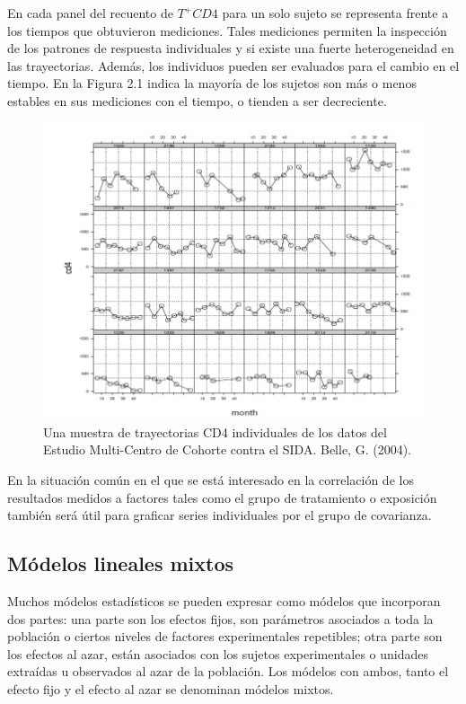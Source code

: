 	En cada panel del recuento de $T^{+}CD4$ para un solo sujeto se representa frente a los tiempos que obtuvieron mediciones. Tales mediciones permiten la inspecci\'on de los patrones de respuesta individuales y si existe una fuerte heterogeneidad en las trayectorias. Adem\'as, los individuos pueden ser evaluados para el cambio en el tiempo. En la Figura 2.1 indica la mayor\'ia de los sujetos son m\'as o menos estables en sus mediciones con el tiempo, o tienden a ser decreciente.
	
	\begin{figure}[H]
	\centering
	\includegraphics[scale=0.5]{datos.jpg}
	\caption{Una muestra de trayectorias CD4 individuales de los datos del Estudio Multi-Centro de Cohorte contra el SIDA. Belle, G. (2004).}
	\end{figure}
	
	En la situaci\'on com\'un en el que se est\'a interesado en la correlaci\'on de los resultados medidos a factores tales como el grupo de tratamiento o exposici\'on tambi\'en ser\'a \'util para graficar series individuales por el grupo de covarianza. \textit{\citet{belle}}

\subsection{M\'odelos lineales mixtos}

	Muchos m\'odelos estad\'isticos se pueden expresar como m\'odelos que incorporan dos partes: una parte son los efectos fijos, son par\'ametros asociados a toda la poblaci\'on o ciertos niveles de factores experimentales repetibles; otra parte son los efectos al azar, est\'an asociados con los sujetos experimentales o unidades extra\'idas u observados al azar de la poblaci\'on. Los m\'odelos con ambos, tanto el efecto fijo y el efecto al azar se denominan m\'odelos mixtos. \\
	 
